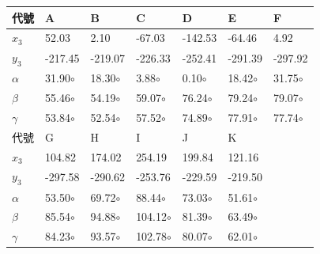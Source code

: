 \begin{table}[htbp]
  \large
  \setlength{\tabcolsep}{0.75cm}
  \begin{tabular}{|p{2cm}|p{2cm}|p{2cm}|p{2cm}|p{2cm}|p{2cm}|p{2cm}|}
    \hline
    代號 & A & B & C & D & E & F \\
    \hline
    $x_3$ & 52.03 & 2.10 & -67.03 & -142.53 & -64.46 & 4.92  \\
    \hline
    $y_3$ & -217.45 & -219.07 & -226.33 & -252.41 & -291.39 & -297.92  \\
    \hline
    $\alpha$ & 31.90$\circ$ & 18.30$\circ$ & 3.88$\circ$ & 0.10$\circ$ & 18.42$\circ$ & 31.75$\circ$  \\
    \hline
    $\beta$ & 55.46$\circ$ & 54.19$\circ$ & 59.07$\circ$ & 76.24$\circ$ & 79.24$\circ$ & 79.07$\circ$  \\
    \hline
    $\gamma$ & 53.84$\circ$ & 52.54$\circ$ & 57.52$\circ$ & 74.89$\circ$ & 77.91$\circ$ & 77.74$\circ$ \\
    \hline
    代號 & G & H & I & J & K & ~ \\
    \hline
    $x_3$ & 104.82 & 174.02 & 254.19 & 199.84 & 121.16 & ~\\
    \hline
    $y_3$ & -297.58 & -290.62 & -253.76 & -229.59 & -219.50 & ~\\
    \hline
    $\alpha$ & 53.50$\circ$ & 69.72$\circ$ & 88.44$\circ$ & 73.03$\circ$ & 51.61$\circ$ & ~\\
    \hline
    $\beta$ & 85.54$\circ$ & 94.88$\circ$ & 104.12$\circ$ & 81.39$\circ$ & 63.49$\circ$ & ~\\
    \hline
    $\gamma$ & 84.23$\circ$ & 93.57$\circ$ & 102.78$\circ$ & 80.07$\circ$ & 62.01$\circ$ & ~\\
    \hline
  \end{tabular}
\end{table}


